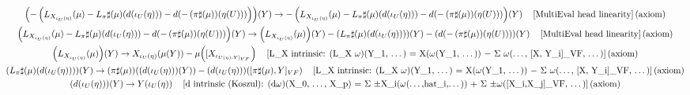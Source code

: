 \documentclass[11pt]{article}
\begin{document}
{\begin{gather*}
\left(-\left(L_{X_{\iota_U(\eta)}}\!\left(\mu\right) - L_\pi\sharp(\mu)\!\left(d\!\left(\iota_U\!\left(\eta\right)\right)\right) - d\!\left(-\left(\pi\sharp\!\left(\mu\right)\right)\!\left(\eta\!\left(U\right)\right)\right)\right)\right)\!\left(Y\right) \to -\left(L_{X_{\iota_U(\eta)}}\!\left(\mu\right) - L_\pi\sharp(\mu)\!\left(d\!\left(\iota_U\!\left(\eta\right)\right)\right) - d\!\left(-\left(\pi\sharp\!\left(\mu\right)\right)\!\left(\eta\!\left(U\right)\right)\right)\right)\!\left(Y\right) \quad \text{[MultiEval head linearity]\,(axiom)} \\
\left(L_{X_{\iota_U(\eta)}}\!\left(\mu\right) - L_\pi\sharp(\mu)\!\left(d\!\left(\iota_U\!\left(\eta\right)\right)\right) - d\!\left(-\left(\pi\sharp\!\left(\mu\right)\right)\!\left(\eta\!\left(U\right)\right)\right)\right)\!\left(Y\right) \to \left(L_{X_{\iota_U(\eta)}}\!\left(\mu\right)\right)\!\left(Y\right) - \left(L_\pi\sharp(\mu)\!\left(d\!\left(\iota_U\!\left(\eta\right)\right)\right)\right)\!\left(Y\right) - \left(d\!\left(-\left(\pi\sharp\!\left(\mu\right)\right)\!\left(\eta\!\left(U\right)\right)\right)\right)\!\left(Y\right) \quad \text{[MultiEval head linearity]\,(axiom)} \\
\left(L_{X_{\iota_U(\eta)}}\!\left(\mu\right)\right)\!\left(Y\right) \to X_{\iota_U(\eta)}\!\left(\mu\!\left(Y\right)\right) - \mu\!\left([X_{\iota_{U(\eta),Y]_{VF}}}\right) \quad \text{[L\_X intrinsic: (L\_X \ensuremath{\omega})(Y\_1, \ensuremath{\dots}) = X(\ensuremath{\omega}(Y\_1, \ensuremath{\dots})) \ensuremath{-} \ensuremath{\Sigma} \ensuremath{\omega}(\ensuremath{\dots}, [X, Y\_i]\_VF, \ensuremath{\dots})]\,(axiom)} \\
\left(L_\pi\sharp(\mu)\!\left(d\!\left(\iota_U\!\left(\eta\right)\right)\right)\right)\!\left(Y\right) \to \left(\pi\sharp\!\left(\mu\right)\right)\!\left(\left(d\!\left(\iota_U\!\left(\eta\right)\right)\right)\!\left(Y\right)\right) - \left(d\!\left(\iota_U\!\left(\eta\right)\right)\right)\!\left([\pi\sharp(\mu),Y]_{VF}\right) \quad \text{[L\_X intrinsic: (L\_X \ensuremath{\omega})(Y\_1, \ensuremath{\dots}) = X(\ensuremath{\omega}(Y\_1, \ensuremath{\dots})) \ensuremath{-} \ensuremath{\Sigma} \ensuremath{\omega}(\ensuremath{\dots}, [X, Y\_i]\_VF, \ensuremath{\dots})]\,(axiom)} \\
\left(d\!\left(\iota_U\!\left(\eta\right)\right)\right)\!\left(Y\right) \to Y\!\left(\iota_U\!\left(\eta\right)\right) \quad \text{[d intrinsic (Koszul): (d\ensuremath{\omega})(X\_0, \ensuremath{\dots}, X\_p) = \ensuremath{\Sigma} \ensuremath{\pm}X\_i(\ensuremath{\omega}(\ensuremath{\dots},hat\_i,\ensuremath{\dots})) + \ensuremath{\Sigma} \ensuremath{\pm}\ensuremath{\omega}([X\_i,X\_j]\_VF, \ensuremath{\dots})]\,(axiom)} \\

\end{gather*}}
\end{document}
